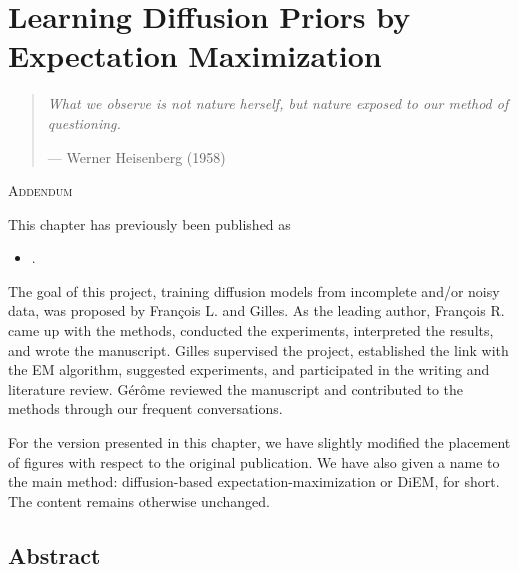 \chapter[Learning Diffusion Priors by Expectation Maximization]{Learning Diffusion Priors by\\Expectation Maximization} \label{chap:diem}

\begin{quote}
    \textit{What we observe is not nature herself, but nature exposed to our method of questioning.}

    \begin{flushright}
        --- Werner Heisenberg (1958) \nocite{heisenberg1958physics}
    \end{flushright}
\end{quote}

\vspace{2em}

\begin{addendum}{\Large\scshape Addendum}

This chapter has previously been published as

\begin{itemize}[leftmargin=1em]
    \item[] .
\end{itemize}

The goal of this project, training diffusion models from incomplete and/or noisy data, was proposed by François L. and Gilles. As the leading author, François R. came up with the methods, conducted the experiments, interpreted the results, and wrote the manuscript. Gilles supervised the project, established the link with the EM algorithm, suggested experiments, and participated in the writing and literature review. Gérôme reviewed the manuscript and contributed to the methods through our frequent conversations.

For the version presented in this chapter, we have slightly modified the placement of figures with respect to the original publication. We have also given a name to the main method: diffusion-based expectation-maximization or DiEM, for short. The content remains otherwise unchanged.

\end{addendum}

\section*{Abstract}

